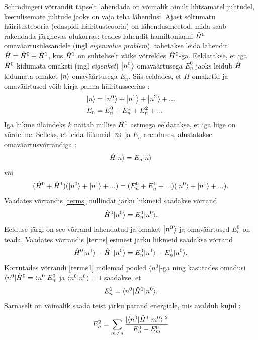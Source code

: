 \documentclass{trkut}%
\renewcommand\bra[1]{{\langle{#1}|}}
\renewcommand\ket[1]{{|{#1}\rangle}}
\renewcommand\Ket[1]{\mleft|#1\mright\rangle}
\renewcommand\braket[1]{\langle{#1}\rangle}
\begin{document}
Schrödingeri võrrandit täpselt lahendada on võimalik ainult lihtsamatel juhtudel, keerulisemate juhtude jaoks on vaja teha lähendusi.
Ajast sõltumatu häiritusteooria (edaspidi häiritusteooria) on lähendusmeetod, mida saab rakendada järgnevas olukorras: teades lahendit hamiltoniaani $\op[0]{H}$ omaväärtusülesandele (ingl \textit{eigenvalue problem}), tahetakse leida lahendit $\op{H}=\op[0]{H}+\op[1]{H}$, kus $\op[1]{H}$ on suhteliselt väike võrreldes $\op[0]{H}$-ga.
Eeldatakse, et iga $\op[0]{H}$ kidumata omaketi (ingl \textit{eigenket}) $\Ket{n^0}$ omaväärtusega $E_n^0$ jaoks leidub $\op{H}$ kidumata omaket $\Ket{n}$ omaväärtusega $E_n$.
Siis eeldades, et $H$ omaketid ja omaväärtused võib kirja panna häiritusseerias \parencite[451]{shankar94}:
\begin{align}
    \Ket{n}&=\Ket{n^0}+\Ket{n^1}+\Ket{n^2}+... \\
    E_n&=E_n^0+E_n^1+E_n^2+...
\end{align}
Iga liikme ülaindeks $k$ näitab millise $\op[1]{H}$ astmega eeldatakse, et iga liige on võrdeline.
Selleks, et leida liikmeid $\Ket{n}$ ja $E_n$ arenduses, alustatakse omaväärtusvõrrandiga \parencite[451-452]{shankar94}:
\begin{equation}
    \op{H}\ket{n}=E_n\ket{n}
\end{equation}
või
\begin{equation}
    (\op[0]{H} + \op[1]{H})(\ket{n^0}+\ket{n^1}+...)=(E_n^0+E_n^1+...) (\ket{n^0}+\ket{n^1}+...).
    \label{terms}
\end{equation}
Vaadates võrrandis \eqref{terms} nullindat järku liikmeid saadakse võrrand
\begin{equation}
    \op[0]{H}\ket{n^0}=E_n^0\ket{n^0}.
\end{equation}
Eelduse järgi on see võrrand lahendatud ja omaket $\Ket{n^0}$ ja omaväärtused $E_n^0$ on teada. Vaadates võrrandis \eqref{terms} esimest järku liikmeid saadakse võrrand
\begin{equation}
    \op[0]{H}\ket{n^1} + \op[1]{H}\ket{n^0} = E_n^0\ket{n^1} + E_n^1\ket{n^0}.
    \label{terms1}
\end{equation}
Korrutades võrrandi \eqref{terms1} mõlemad pooled $\bra{n^0}$-ga ning kasutades omadusi $\bra{n^0}\op[0]{H}=\bra{n^0}E_n^0$ ja $\braket{n^0|n^0}=1$ saadakse, et
\begin{equation}
    E_n^1=\braket{n^0|\op[1]{H}|n^0}.
    \label{parand1}
\end{equation}
Sarnaselt on võimalik saada teist järku parand energiale, mis avaldub kujul \parencite[451-453]{shankar94}:
\begin{equation}
    E_n^2=\sum_{m \neq n} \frac{|\braket{n^0|\op[1]{H}|m^0}|^2}{E_n^0-E_m^0}
    \label{parand2}
\end{equation}
\end{document}
